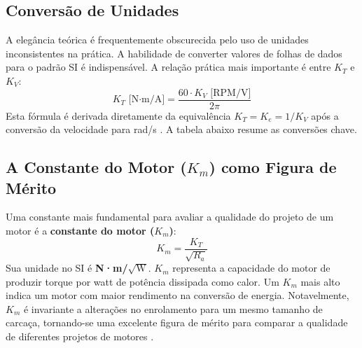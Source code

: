 \subsection{Conversão de Unidades}

A elegância teórica é frequentemente obscurecida pelo uso de unidades inconsistentes na prática. A habilidade de converter valores de folhas de dados para o padrão SI é indispensável. A relação prática mais importante é entre $K_T$ e $K_V$:
\begin{equation}
    K_T \text{ [N·m/A]} = \frac{60 \cdot K_V \text{ [RPM/V]}}{2\pi}
\end{equation}
Esta fórmula é derivada diretamente da equivalência $K_T = K_e = 1/K_V$ após a conversão da velocidade para rad/s \parencite{infineon2011bldc}. A tabela abaixo resume as conversões chave.

\begin{table}[H]
\centering
\caption{Unidades de Constantes de Motor e Fatores de Conversão para o SI}
\label{tab:unidades}

\end{table}

\subsection{\texorpdfstring{A Constante do Motor ($K_m$) como Figura de Mérito}{A Constante do Motor (Km) como Figura de Mérito}}

Uma constante mais fundamental para avaliar a qualidade do projeto de um motor é a \textbf{constante do motor ($K_m$)}:
\begin{equation}
    K_m = \frac{K_T}{\sqrt{R_a}}
\end{equation}
Sua unidade no SI é \textbf{N·m/$\sqrt{\text{W}}$}. $K_m$ representa a capacidade do motor de produzir torque por watt de potência dissipada como calor. Um $K_m$ mais alto indica um motor com maior rendimento na conversão de energia. Notavelmente, $K_m$ é invariante a alterações no enrolamento para um mesmo tamanho de carcaça, tornando-se uma excelente figura de mérito para comparar a qualidade de diferentes projetos de motores \parencite{infineon2011bldc}.

